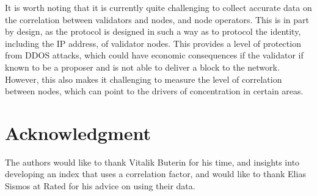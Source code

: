 \documentclass[conference]{IEEEtran}
\begin{document}
It is worth noting that it is currently quite challenging to collect accurate data on the  correlation between validators and nodes, and node operators.  This is in part by design, as the protocol is designed in such a way as to protocol the identity, including the IP address, of validator nodes.  This provides a level of protection from DDOS attacks, which could have economic consequences if the validator if known to be a proposer and is not able to deliver a block to the network.  However, this also makes it challenging to measure the level of correlation between nodes, which can point to the drivers of concentration in certain areas.

\section*{Acknowledgment}

The authors would like to thank Vitalik Buterin for his time, and insights into developing an index that uses a correlation factor, and would like to thank Elias Sismos at Rated for his advice on using their data.

\printbibliography
\end{document}
